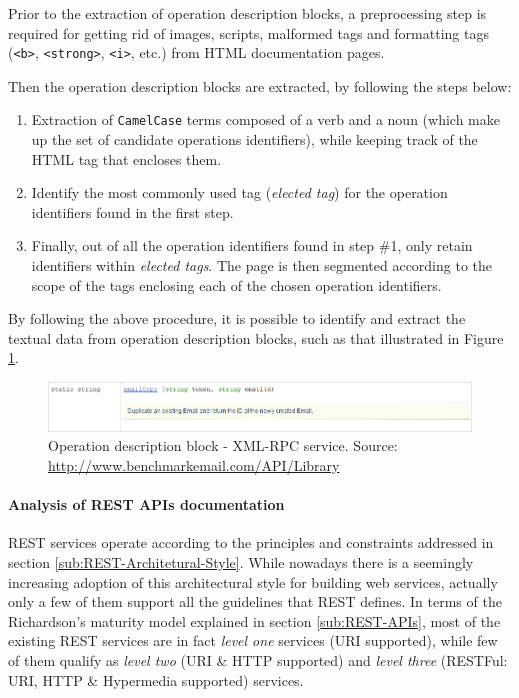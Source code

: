 Prior to the extraction of operation description blocks, a preprocessing step is required for getting rid of images, scripts, malformed tags and formatting tags (\texttt{<b>}, \texttt{<strong>}, \texttt{<i>}, etc.) from HTML documentation pages.

Then the operation description blocks are extracted, by following the steps below: 

\begin{enumerate}
 \item Extraction of \texttt{CamelCase} terms composed of a verb and a noun (which make up the set of candidate operations identifiers), while keeping track of the HTML tag that encloses them.
 \item Identify the most commonly used tag (\emph{elected tag}) for the operation identifiers found in the first step.
 \item Finally, out of all the operation identifiers found in step \#1, only retain identifiers within \emph{elected tags}. The page is then segmented according to the scope of the tags enclosing each of the chosen operation identifiers.
\end{enumerate}

By following the above procedure, it is possible to identify and extract the textual data from operation description blocks, such as that illustrated in Figure \ref{xml-rpc-op-block}.

\begin{figure}
 \includegraphics[scale=0.5]{images/xml-rpc-operation-block}

 \caption{Operation description block - XML-RPC service. {\scriptsize Source:
 \protect\href{http://www.benchmarkemail.com/API/Library}{http://www.benchmarkemail.com/API/Library}}}
 \label{xml-rpc-op-block}
\end{figure}

\paragraph{Analysis of REST APIs documentation}
\label{parag:rest}
REST services operate according to the principles and constraints addressed in section \ref{sub:REST-Architetural-Style}. While nowadays there is a seemingly increasing adoption of this architectural style for building web services, actually only a few of them support all the guidelines that REST defines. In terms of the Richardson's maturity model explained in section \ref{sub:REST-APIs}, most of the existing REST services are in fact \emph{level one }services\emph{ }(URI supported), while few of them qualify as \emph{level two }(URI \& HTTP supported) and \emph{level three} (RESTFul: URI, HTTP \& Hypermedia supported) services.

